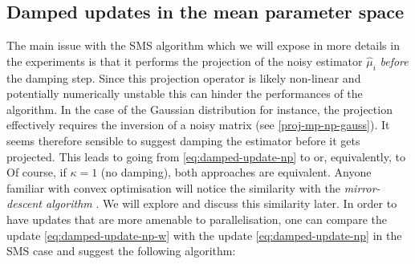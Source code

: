 \subsection{Damped updates in the mean parameter space}

The main issue with the SMS algorithm which we will expose in more details in the experiments is that it performs the projection of the noisy estimator $\hat\mu_{i}$ \emph{before} the damping step. Since this projection operator is likely non-linear and potentially numerically unstable this can hinder the performances of the algorithm. In the case of the Gaussian distribution for instance, the projection effectively requires the inversion of a noisy matrix (see \eqref{proj-mp-np-gauss}). It seems therefore sensible to suggest damping the estimator before it gets projected. This leads to going from \eqref{eq:damped-update-np} to
%
%
or, equivalently, to
%
%
Of course, if $\kappa=1$ (no damping), both approaches are equivalent. Anyone familiar with convex optimisation will notice the similarity with the \emph{mirror-descent algorithm} \citep{nemirovski83, beck03}. We will explore and discuss this similarity later. 
In order to have updates that are more amenable to parallelisation, one can compare the update \eqref{eq:damped-update-np-w} with the update \eqref{eq:damped-update-np} in the SMS case and suggest the following algorithm:
%
%

\subsection{}
